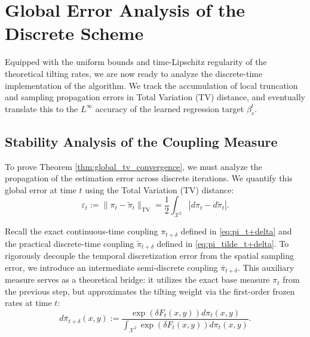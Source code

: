 \documentclass[11pt]{article}
\theoremstyle{definition}
\numberwithin{equation}{section}%
\begin{document}
{\section{Global Error Analysis of the Discrete Scheme}
\label{app:error_analysis}
Equipped with the uniform bounds and time-Lipschitz regularity of the theoretical tilting rates, we are now ready to analyze the discrete-time implementation of the algorithm. We track the accumulation of local truncation and sampling propagation errors in Total Variation (TV) distance, and eventually translate this to the $L^\infty$ accuracy of the learned regression target $\beta_s^t$.

\subsection{Stability Analysis of the Coupling Measure}
To prove Theorem \ref{thm:global_tv_convergence}, we must analyze the propagation of the estimation error across discrete iterations. We quantify this global error at time $t$ using the Total Variation (TV) distance:
\begin{equation*}
\varepsilon_t := \|\pi_t - \tilde{\pi}_t\|_{\mathrm{TV}} = \frac{1}{2} \int_{\mathcal{X}^2} |d\pi_t - d\tilde{\pi}_t|.
\end{equation*}

Recall the exact continuous-time coupling $\pi_{t+\delta}$ defined in \eqref{eq:pi_t+delta} and the practical discrete-time coupling $\tilde{\pi}_{t+\delta}$ defined in \eqref{eq:pi_tilde_t+delta}. To rigorously decouple the temporal discretization error from the spatial sampling error, we introduce an intermediate semi-discrete coupling $\bar{\pi}_{t+\delta}$. This auxiliary measure serves as a theoretical bridge: it utilizes the exact base measure $\pi_t$ from the previous step, but approximates the tilting weight via the first-order frozen rates at time $t$:
\begin{equation}
\label{eq:pi_semidiscrete}
d\bar{\pi}_{t+\delta}(x,y) := \frac{\exp\left( \delta F_t(x,y) \right) d\pi_t(x,y)}{\int_{\mathcal{X}^2} \exp\left( \delta F_t(x,y) \right) d\pi_t(x,y)}.
\end{equation}

}
\end{document}
